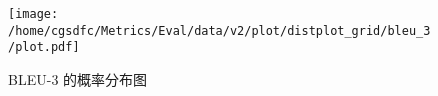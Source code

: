\begin{figure}[H]%
\centering%
\texttt{[image: /home/cgsdfc/Metrics/Eval/data/v2/plot/distplot\_grid/bleu\_3/plot.pdf]}%
\caption{BLEU{-}3 的概率分布图}%
\label{fig:BLEU{-}3dist}%
\end{figure}